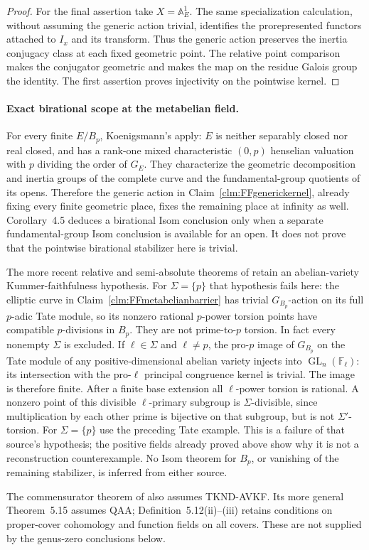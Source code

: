 \begin{proof}
For the final assertion take \(X=\mathbb A^1_E\).
The same specialization calculation, without assuming
the generic action trivial, identifies the prorepresented
functors attached to \(I_x\) and its transform. Thus
the generic action preserves the inertia conjugacy class
at each fixed geometric point. The relative point
comparison makes the conjugator geometric and makes the
map on the residue Galois group the identity. The first
assertion proves injectivity on the pointwise kernel.
\end{proof}

\paragraph{Exact birational scope at the metabelian field.}
For every finite \(E/B_p\), Koenigsmann's
\citet[Theorem~4.1, Corollaries~4.3 and~4.5]
{FF_Koenigsmann2003} apply: \(E\) is neither separably
closed nor real closed, and has a rank-one mixed
characteristic \((0,p)\) henselian valuation with
\(p\) dividing the order of \(G_E\).
They characterize the geometric decomposition and inertia
groups of the complete curve and the fundamental-group
quotients of its opens. Therefore the generic action in
Claim~\ref{clm:FFgenerickernel}, already fixing every
finite geometric place, fixes the remaining place at
infinity as well. Corollary~4.5 deduces a birational
Isom conclusion only when a separate fundamental-group
Isom conclusion is available for an open. It does not
prove that the pointwise birational stabilizer here is
trivial.

The more recent relative and semi-absolute theorems of
\citet[Theorems~A and~E, Definition~1.1,
Proposition~2.6]{FF_Tsujimura2026} retain an abelian-variety
Kummer-faithfulness hypothesis. For \(\Sigma=\{p\}\)
that hypothesis fails here: the elliptic curve in
Claim~\ref{clm:FFmetabelianbarrier} has trivial
\(G_{B_p}\)-action on its full \(p\)-adic Tate module,
so its nonzero rational \(p\)-power torsion points have
compatible \(p\)-divisions in \(B_p\). They are not
prime-to-\(p\) torsion. In fact every nonempty
\(\Sigma\) is excluded. If \(\ell\in\Sigma\)
and \(\ell\ne p\), the pro-\(p\) image of
\(G_{B_p}\) on the Tate module of any positive-dimensional
abelian variety injects into \(\operatorname{GL}_n(\mathbb F_\ell)\):
its intersection with the pro-\(\ell\) principal
congruence kernel is trivial. The image is therefore
finite. After a finite base extension all
\(\ell\)-power torsion is rational. A nonzero point
of this divisible \(\ell\)-primary subgroup is
\(\Sigma\)-divisible, since multiplication by each
other prime is bijective on that subgroup, but is not
\(\Sigma'\)-torsion. For \(\Sigma=\{p\}\) use
the preceding Tate example. This is a failure of that
source's hypothesis; the positive fields already proved
above show why it is not a reconstruction counterexample.
No Isom theorem for \(B_p\),
or vanishing of the remaining stabilizer, is inferred
from either source.

The commensurator theorem of
\citet[Theorem~6.8]{FF_HoshiMochizukiTsujimura2025}
also assumes TKND-AVKF. Its more general
Theorem~5.15 assumes QAA; Definition~5.12(ii)--(iii)
retains conditions on proper-cover cohomology and
function fields on all covers. These are not supplied
by the genus-zero conclusions below.
